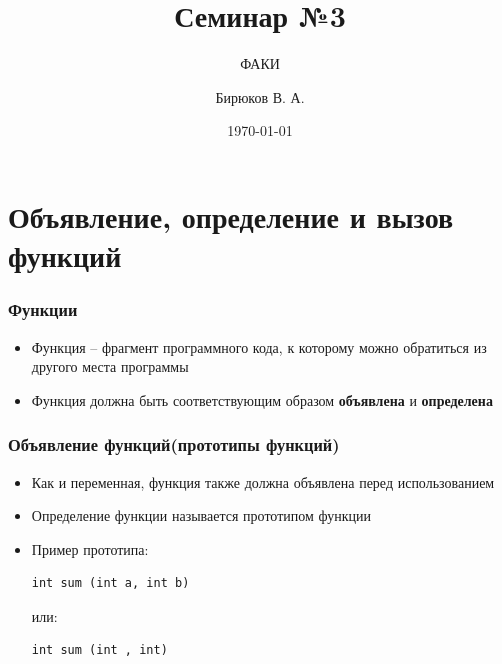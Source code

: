\documentclass[12pt,pdf,hyperref={unicode}]{beamer}
\title{Семинар №3}
\subtitle{ФАКИ \the\year}
\author{Бирюков В. А.}
\date{\today}
\begin{document}
\lstset{language=C}

\begin{frame}
\titlepage
\end{frame} 



\section{Объявление, определение и вызов функций}

\begin{frame}[fragile]
\frametitle{Функции} 

\begin{itemize}
\item Функция -- фрагмент программного кода, к которому можно обратиться из другого места программы
\item Функция должна быть соответствующим образом \textbf{объявлена} и \textbf{определена}
\end{itemize}

\end{frame}

\begin{frame}[fragile]
\frametitle{Объявление функций(прототипы функций)} 
\begin{itemize}
\item Как и переменная, функция также должна объявлена перед использованием
\item Определение функции называется прототипом функции
\item Пример прототипа:\\
\begin{lstlisting}
int sum (int a, int b)
\end{lstlisting}
или:
\begin{lstlisting}
int sum (int , int)
\end{lstlisting}
\end{itemize}
\end{frame}
\end{document}
